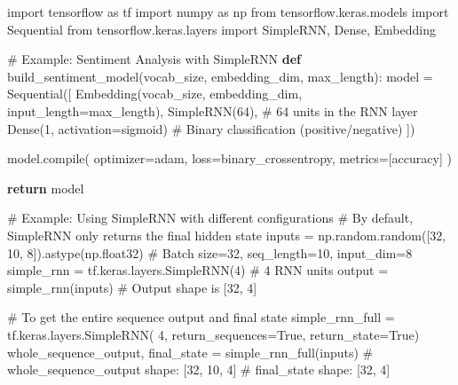 \documentclass[
  letterpaper,
  DIV=11,
  numbers=noendperiod]{scrreprt}
\newenvironment{Shaded}{\begin{snugshade}}{\end{snugshade}}
\newcommand{\BuiltInTok}[1]{\textcolor[rgb]{0.00,0.23,0.31}{#1}}
\newcommand{\CommentTok}[1]{\textcolor[rgb]{0.37,0.37,0.37}{#1}}
\newcommand{\ControlFlowTok}[1]{\textcolor[rgb]{0.00,0.23,0.31}{\textbf{#1}}}
\newcommand{\DecValTok}[1]{\textcolor[rgb]{0.68,0.00,0.00}{#1}}
\newcommand{\ImportTok}[1]{\textcolor[rgb]{0.00,0.46,0.62}{#1}}
\newcommand{\KeywordTok}[1]{\textcolor[rgb]{0.00,0.23,0.31}{\textbf{#1}}}
\newcommand{\NormalTok}[1]{\textcolor[rgb]{0.00,0.23,0.31}{#1}}
\newcommand{\OperatorTok}[1]{\textcolor[rgb]{0.37,0.37,0.37}{#1}}
\newcommand{\StringTok}[1]{\textcolor[rgb]{0.13,0.47,0.30}{#1}}
\newcommand{\VariableTok}[1]{\textcolor[rgb]{0.07,0.07,0.07}{#1}}
\begin{document}
\begin{Shaded}
\begin{Highlighting}[]
\ImportTok{import}\NormalTok{ tensorflow }\ImportTok{as}\NormalTok{ tf}
\ImportTok{import}\NormalTok{ numpy }\ImportTok{as}\NormalTok{ np}
\ImportTok{from}\NormalTok{ tensorflow.keras.models }\ImportTok{import}\NormalTok{ Sequential}
\ImportTok{from}\NormalTok{ tensorflow.keras.layers }\ImportTok{import}\NormalTok{ SimpleRNN, Dense, Embedding}

\CommentTok{\# Example: Sentiment Analysis with SimpleRNN}
\KeywordTok{def}\NormalTok{ build\_sentiment\_model(vocab\_size, embedding\_dim, max\_length):}
\NormalTok{    model }\OperatorTok{=}\NormalTok{ Sequential([}
\NormalTok{        Embedding(vocab\_size, embedding\_dim, input\_length}\OperatorTok{=}\NormalTok{max\_length),}
\NormalTok{        SimpleRNN(}\DecValTok{64}\NormalTok{),  }\CommentTok{\# 64 units in the RNN layer}
\NormalTok{        Dense(}\DecValTok{1}\NormalTok{, activation}\OperatorTok{=}\StringTok{\textquotesingle{}sigmoid\textquotesingle{}}\NormalTok{)  }\CommentTok{\# Binary classification (positive/negative)}
\NormalTok{    ])}
    
\NormalTok{    model.}\BuiltInTok{compile}\NormalTok{(}
\NormalTok{        optimizer}\OperatorTok{=}\StringTok{\textquotesingle{}adam\textquotesingle{}}\NormalTok{,}
\NormalTok{        loss}\OperatorTok{=}\StringTok{\textquotesingle{}binary\_crossentropy\textquotesingle{}}\NormalTok{,}
\NormalTok{        metrics}\OperatorTok{=}\NormalTok{[}\StringTok{\textquotesingle{}accuracy\textquotesingle{}}\NormalTok{]}
\NormalTok{    )}
    
    \ControlFlowTok{return}\NormalTok{ model}

\CommentTok{\# Example: Using SimpleRNN with different configurations}
\CommentTok{\# By default, SimpleRNN only returns the final hidden state}
\NormalTok{inputs }\OperatorTok{=}\NormalTok{ np.random.random([}\DecValTok{32}\NormalTok{, }\DecValTok{10}\NormalTok{, }\DecValTok{8}\NormalTok{]).astype(np.float32)  }\CommentTok{\# Batch size=32, seq\_length=10, input\_dim=8}
\NormalTok{simple\_rnn }\OperatorTok{=}\NormalTok{ tf.keras.layers.SimpleRNN(}\DecValTok{4}\NormalTok{)  }\CommentTok{\# 4 RNN units}
\NormalTok{output }\OperatorTok{=}\NormalTok{ simple\_rnn(inputs)  }\CommentTok{\# Output shape is [32, 4]}

\CommentTok{\# To get the entire sequence output and final state}
\NormalTok{simple\_rnn\_full }\OperatorTok{=}\NormalTok{ tf.keras.layers.SimpleRNN(}
    \DecValTok{4}\NormalTok{, return\_sequences}\OperatorTok{=}\VariableTok{True}\NormalTok{, return\_state}\OperatorTok{=}\VariableTok{True}\NormalTok{)}
\NormalTok{whole\_sequence\_output, final\_state }\OperatorTok{=}\NormalTok{ simple\_rnn\_full(inputs)}
\CommentTok{\# whole\_sequence\_output shape: [32, 10, 4]}
\CommentTok{\# final\_state shape: [32, 4]}
\end{Highlighting}
\end{Shaded}
\end{document}
